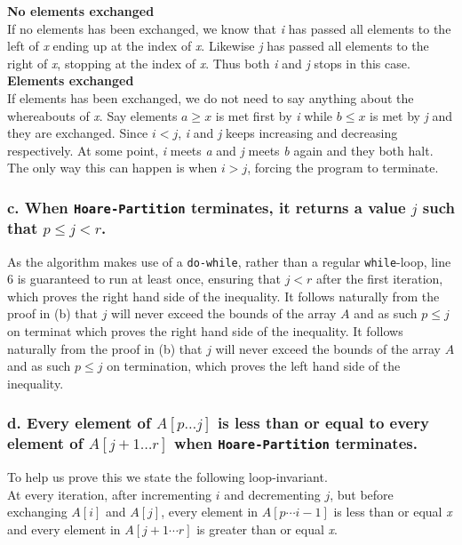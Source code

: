 \documentclass[11pt,english]{article}
\begin{document}
\textbf{No elements exchanged}\\
If no elements has been exchanged, we know that \textit{i} has passed all
elements to the left of \textit{x} ending up at the index of \textit{x}.
Likewise \textit{j} has passed all elements to the right of \textit{x},
stopping at the index of \textit{x}. Thus both \textit{i} and \textit{j}
stops in this case.\\

\textbf{Elements exchanged}\\
If elements has been exchanged, we do not need to say anything about the
whereabouts of \textit{x}. Say elements $a \geq x$ is met first by \textit{i}
while $b \leq x$ is met by \textit{j} and they are exchanged. Since
$i<j$, \textit{i} and \textit{j} keeps increasing and decreasing respectively.
At some point, \textit{i} meets \textit{a} and \textit{j} meets \textit{b}
again and they both halt. The only way this can happen is when $i>j$, forcing
the program to terminate.

\subsubsection*{\large c. \mdseries When \texttt{Hoare-Partition} terminates,
it returns a value $j$ such that $p \leq j < r$.}
As the algorithm makes use of a \texttt{do-while}, rather than a regular
\texttt{while}-loop, line 6 is guaranteed to run at least once, ensuring that
$j < r$ after the first iteration, which proves the right hand side of the
inequality. It follows naturally from the proof in (b) that $j$ will never
exceed the bounds of the array $A$ and as such $p \leq j$ on terminat which
proves the right hand side of the inequality. It follows naturally from the
proof in (b) that $j$ will never exceed the bounds of the array $A$ and as
such $p \leq j$ on termination, which proves the left hand side of the
inequality. 

\subsubsection*{\large d. \mdseries Every element of $A[p \dots j]$ is less
than or equal to every element of $A[j + 1 \dots r]$ when
\texttt{Hoare-Partition} terminates.}

To help us prove this we state the following loop-invariant. \\

At every iteration, after incrementing $i$ and decrementing $j$, but before 
exchanging $A[i]$ and $A[j]$, every element in $A[p \cdots i-1]$ is less than
or equal \textit{x} and every element in $A[j+1 \cdots r]$ is greater than
or equal \textit{x}.
\end{document}
